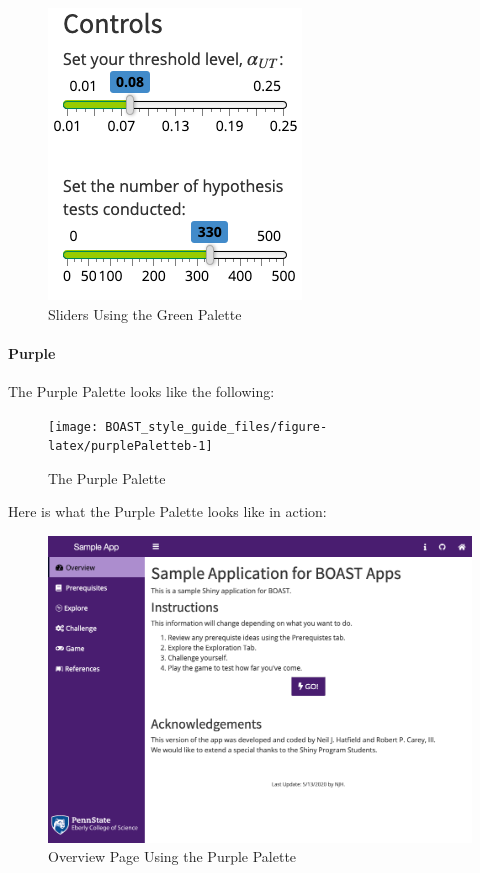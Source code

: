 \documentclass[
]{book}
\begin{document}
\begin{figure}

{\centering \includegraphics{images/colorThemes/greenSliders} 

}

\caption{Sliders Using the Green Palette}\label{fig:greenAction3b}
\end{figure}

\hypertarget{purple-1}{%
\paragraph{Purple}\label{purple-1}}

The Purple Palette looks like the following:

\begin{figure}

{\centering \texttt{[image: BOAST\_style\_guide\_files/figure-latex/purplePaletteb-1]} 

}

\caption{The Purple Palette}\label{fig:purplePaletteb}
\end{figure}

Here is what the Purple Palette looks like in action:

\begin{figure}

{\centering \includegraphics[width=14in]{images/colorThemes/purpleOverview} 

}

\caption{Overview Page Using the Purple Palette}\label{fig:purpleAction1b}
\end{figure}
\end{document}
